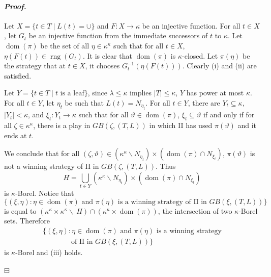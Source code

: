 \documentclass[12pt,a4paper]{amsart}
\theoremstyle{definition}
\theoremstyle{remark}
\DeclareMathOperator{\dom}{dom}
\DeclareMathOperator{\rng}{rng}
\renewcommand{\mid}{\mathrel{|}\allowbreak}
\newenvironment{cproof}{\paragraph{\emph{Proof.\,}}}{\hfill{$\boxminus$}\par\vspace{2mm}}
\begin{document}
\begin{cproof}

Let $X=\{t\in T\mid L(t)=\cup\}$ and $F:X\rightarrow\kappa$ be an injective function. For all $t\in X$, let $G_t$ be an injective function from the immediate successors of $t$ to $\kappa$. Let $\dom(\pi)$ be the set of all $\eta\in \kappa^\kappa$ such that for all $t\in X$, $\eta(F(t))\in \rng(G_t)$. It is clear that $\dom(\pi)$ is $\kappa$-closed. Let $\pi(\eta)$ be the strategy that at $t\in X$, it chooses $G^{-1}_t(\eta(F(t)))$. Clearly (i) and (ii) are satisfied.

Let $Y=\{t\in T\mid t \text{ is a leaf}\}$, since $\lambda\leq\kappa$ implies $|T|\leq\kappa$, $Y$ has power at most $\kappa$. For all $t\in Y$, let $\eta_t$ be such that $L(t)=N_{\eta_t}$. For all $t\in Y$, there are $Y_t\subseteq \kappa$, $|Y_t|<\kappa$, and $\xi_t:Y_t\rightarrow\kappa$ such that for all $\vartheta\in \dom(\pi)$, $\xi_t\subseteq \vartheta$ if and only if for all $\zeta\in \kappa^\kappa$, there is a play in $GB(\zeta,(T,L))$ in which II has used $\pi(\vartheta)$ and it ends at $t$.

We conclude that for all $(\zeta,\vartheta)\in (\kappa^\kappa\backslash N_{\eta_t})\times (\dom(\pi)\cap N_{\xi_t})$, $\pi(\vartheta)$ is not a winning strategy of II in $GB(\zeta,(T,L))$. Thus $$H=\bigcup_{t\in Y}(\kappa^\kappa\backslash N_{\eta_t})\times (\dom(\pi)\cap N_{\xi_t})$$ is $\kappa$-Borel. Notice that $$\{(\xi,\eta) : \eta\in\dom(\pi)\text{ and }\pi(\eta)\mbox{ is a winning strategy of II in }GB(\xi,(T,L))\}$$ is equal to $(\kappa^\kappa\times\kappa^\kappa\backslash\ H)\cap \left(\kappa^\kappa\times \dom(\pi)\right)$, the intersection of two $\kappa$-Borel sets.
%
Therefore $$\begin{array}{l}
\{(\xi,\eta) : \eta\in\dom(\pi)\text{ and }\pi(\eta)\mbox{ is a winning strategy}\\ \qquad\qquad\text{of II in }GB(\xi,(T,L))\}\end{array}$$ is $\kappa$-Borel and (iii) holds.

\end{cproof}
\end{document}
